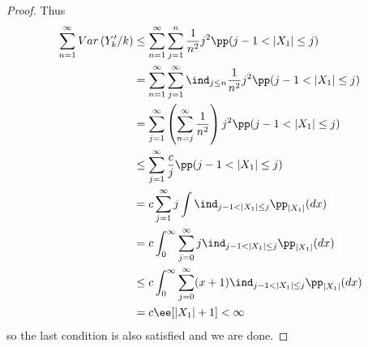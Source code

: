 \documentclass[../main.tex]{subfiles}
\begin{document}
\begin{proof}
     Thus
     \begin{align*}
       \sum_{n = 1}^\infty Var \left( Y_k'/k \right) &\leq \sum_{n=1}^\infty
       \sum_{j=1}^n \frac{1}{n^2}j^2 \pp(j-1 < |X_1| \leq j) \\
       &= \sum_{n=1}^\infty \sum_{j=1}^\infty \ind_{j \leq n} \frac{1}{n^2}
       j^2 \pp(j -1 < |X_1| \leq j) \\
       &= \sum_{j=1}^\infty \left(\sum_{n=j}^\infty \frac{1}{n^2} \right)
       j^2 \pp(j -1 < |X_1| \leq j) \\
       &\leq \sum_{j=1}^\infty \frac{c}{j} \pp(j-1 < |X_1| \leq j) \\
       &= c\sum_{j=1}^\infty j \int \ind_{j-1 < |X_1| \leq j} \pp_{|X_1|}(dx)
       \\
       &= c\int_{0}^\infty \sum_{j=0}^{\infty} j \ind_{j-1 < |X_1| \leq
       j}\pp_{|X_1|}(dx) \\
       &\leq  c\int_{0}^\infty \sum_{j=0}^{\infty} (x+1) \ind_{j-1 < |X_1| \leq
       j}\pp_{|X_1|}(dx) \\
       &= c \ee[|X_1| + 1] < \infty
     \end{align*}
     so the last condition is also satisfied and we are done.

   \end{proof}
\end{document}
